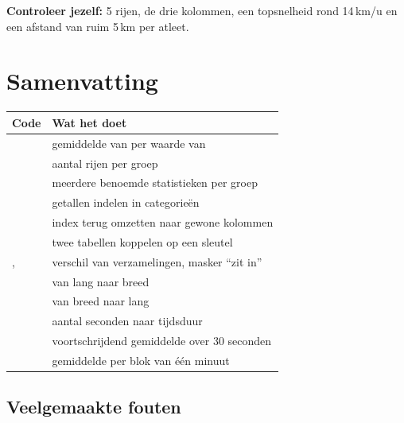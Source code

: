 \documentclass[11pt,a4paper]{article}
\begin{document}
\textbf{Controleer jezelf:} 5 rijen, de drie kolommen, een topsnelheid
rond 14\,km/u en een afstand van ruim 5\,km per atleet.

\section{Samenvatting}

\begin{center}
\begin{tabularx}{\textwidth}{@{}L{8.4cm}Y@{}}
\toprule
\textbf{Code} & \textbf{Wat het doet} \\
\midrule
{} & gemiddelde van  per waarde van  \\
 & aantal rijen per groep \\
 & meerdere benoemde statistieken per groep \\
 & getallen indelen in categorieën \\
 & index terug omzetten naar gewone kolommen \\
 & twee tabellen koppelen op een sleutel \\
,  & verschil van verzamelingen, masker ``zit in'' \\
 & van lang naar breed \\
 & van breed naar lang \\
 & aantal seconden naar tijdsduur \\
 & voortschrijdend gemiddelde over 30 seconden \\
 & gemiddelde per blok van één minuut \\
\bottomrule
\end{tabularx}
\end{center}

\subsection*{Veelgemaakte fouten}
\end{document}
